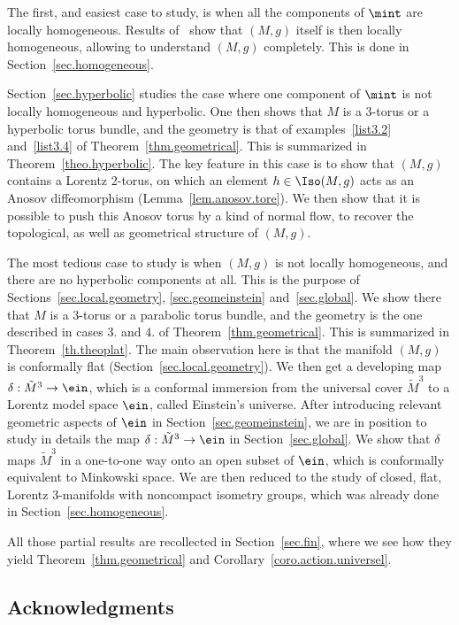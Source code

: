 The first, and easiest case to study, is when all the components of $\mint$ are locally homogeneous. Results of~\cite{frances.open} show that $(M,g)$ itself is then locally homogeneous, allowing to understand $(M,g)$ completely. This is done in Section~\ref{sec.homogeneous}.

Section~\ref{sec.hyperbolic} studies the case where one component of $\mint$ is not locally homogeneous and hyperbolic. One then shows that $M$ is a $3$-torus or a hyperbolic torus bundle, and the geometry is that of examples~\eqref{list3.2} and~\eqref{list3.4} of Theorem~\ref{thm.geometrical}. This is summarized in Theorem~\ref{theo.hyperbolic}. The key feature in this case is to show that $(M,g)$ contains a Lorentz $2$-torus, on which an element $h \in \Iso(M,g)$ acts as an Anosov diffeomorphism (Lemma~\ref{lem.anosov.tore}). We then show that it is possible to push this Anosov torus by a kind of normal flow, to recover the topological, as well as geometrical structure of $(M,g)$.

The most tedious case to study is when $(M,g)$ is not locally homogeneous, and there are no hyperbolic components at all. This is the purpose of Sections~\ref{sec.local.geometry}, \ref{sec.geomeinstein} and~\ref{sec.global}. We show there that $M$ is a $3$-torus or a parabolic torus bundle, and the geometry is the one described in cases $3.$ and $4.$ of Theorem~\ref{thm.geometrical}. This is summarized in Theorem~\ref{th.theoplat}. The main observation here is that the manifold $(M,g)$ is conformally flat (Section~\ref{sec.local.geometry}). We then get a developing map $\delta: \tilde{M}^3 \to \ein$, which is a conformal immersion from the universal cover $\tilde{M}^3$ to a Lorentz model space $\ein$, called Einstein's universe. After introducing relevant geometric aspects of $\ein$ in Section~\ref{sec.geomeinstein}, we are in position to study in details the map $\delta: \tilde{M}^3 \to \ein$ in Section~\ref{sec.global}. We show that $\delta$ maps $\tilde{M}^3$ in a one-to-one way onto an open subset of $\ein$, which is conformally equivalent to Minkowski space. We are then reduced to the study of closed, flat, Lorentz $3$-manifolds with noncompact isometry groups, which was already done in Section~\ref{sec.homogeneous}.

All those partial results are recollected in Section~\ref{sec.fin}, where we see how they yield Theorem~\ref{thm.geometrical} and Corollary~\ref{coro.action.universel}.

\subsection*{Acknowledgments}

